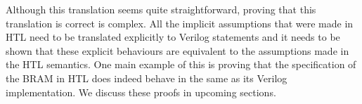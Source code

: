 Although this translation seems quite straight\-forward, proving that this
translation is correct is complex.  All the implicit assumptions that were made
in HTL need to be translated explicitly to Verilog statements and it needs to be
shown that these explicit behaviours are equivalent to the assumptions made in
the HTL semantics.  One main example of this is proving that the specification
of the \gls{BRAM} in HTL does indeed behave in the same as its Verilog
implementation.  We discuss these proofs in upcoming sections.


